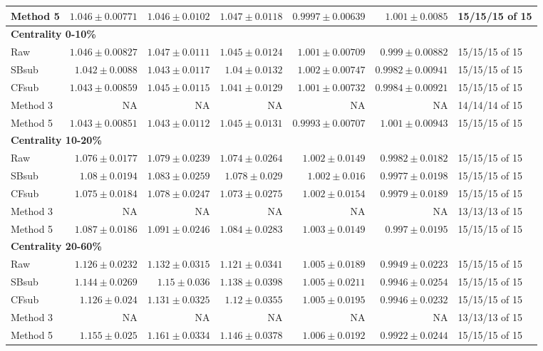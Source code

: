 \documentclass[10pt,a4paper]{article}
\begin{document}
{\begin{longtable}{lrrrrrl}
Method 5 & $1.046\pm0.00771$ & $1.046\pm0.0102$ & $1.047\pm0.0118$ & $0.9997\pm0.00639$ & $1.001\pm0.0085$ & 15/15/15 of 15\\
\hline
\multicolumn{7}{l}{\textbf{Centrality 0-10\%}}\\
Raw & $1.046\pm0.00827$ & $1.047\pm0.0111$ & $1.045\pm0.0124$ & $1.001\pm0.00709$ & $0.999\pm0.00882$ & 15/15/15 of 15\\
SBsub & $1.042\pm0.0088$ & $1.043\pm0.0117$ & $1.04\pm0.0132$ & $1.002\pm0.00747$ & $0.9982\pm0.00941$ & 15/15/15 of 15\\
CFsub & $1.043\pm0.00859$ & $1.045\pm0.0115$ & $1.041\pm0.0129$ & $1.001\pm0.00732$ & $0.9984\pm0.00921$ & 15/15/15 of 15\\
Method 3 & NA & NA & NA & NA & NA & 14/14/14 of 15\\
Method 5 & $1.043\pm0.00851$ & $1.043\pm0.0112$ & $1.045\pm0.0131$ & $0.9993\pm0.00707$ & $1.001\pm0.00943$ & 15/15/15 of 15\\
\hline
\multicolumn{7}{l}{\textbf{Centrality 10-20\%}}\\
Raw & $1.076\pm0.0177$ & $1.079\pm0.0239$ & $1.074\pm0.0264$ & $1.002\pm0.0149$ & $0.9982\pm0.0182$ & 15/15/15 of 15\\
SBsub & $1.08\pm0.0194$ & $1.083\pm0.0259$ & $1.078\pm0.029$ & $1.002\pm0.016$ & $0.9977\pm0.0198$ & 15/15/15 of 15\\
CFsub & $1.075\pm0.0184$ & $1.078\pm0.0247$ & $1.073\pm0.0275$ & $1.002\pm0.0154$ & $0.9979\pm0.0189$ & 15/15/15 of 15\\
Method 3 & NA & NA & NA & NA & NA & 13/13/13 of 15\\
Method 5 & $1.087\pm0.0186$ & $1.091\pm0.0246$ & $1.084\pm0.0283$ & $1.003\pm0.0149$ & $0.997\pm0.0195$ & 15/15/15 of 15\\
\hline
\multicolumn{7}{l}{\textbf{Centrality 20-60\%}}\\
Raw & $1.126\pm0.0232$ & $1.132\pm0.0315$ & $1.121\pm0.0341$ & $1.005\pm0.0189$ & $0.9949\pm0.0223$ & 15/15/15 of 15\\
SBsub & $1.144\pm0.0269$ & $1.15\pm0.036$ & $1.138\pm0.0398$ & $1.005\pm0.0211$ & $0.9946\pm0.0254$ & 15/15/15 of 15\\
CFsub & $1.126\pm0.024$ & $1.131\pm0.0325$ & $1.12\pm0.0355$ & $1.005\pm0.0195$ & $0.9946\pm0.0232$ & 15/15/15 of 15\\
Method 3 & NA & NA & NA & NA & NA & 13/13/13 of 15\\
Method 5 & $1.155\pm0.025$ & $1.161\pm0.0334$ & $1.146\pm0.0378$ & $1.006\pm0.0192$ & $0.9922\pm0.0244$ & 15/15/15 of 15\\
\hline
\end{longtable}}
\end{document}
